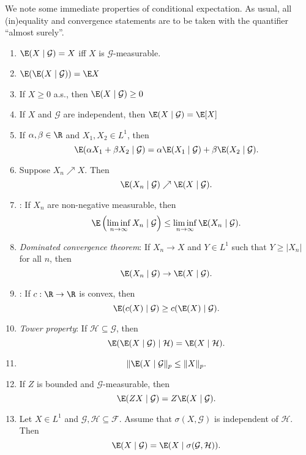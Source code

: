 \documentclass[a4paper]{article}
\begin{document}
We note some immediate properties of conditional expectation. As usual, all (in)equality and convergence statements are to be taken with the quantifier ``almost surely''.
\begin{prop}\leavevmode
  \begin{enumerate}
    \item $\E(X \mid \mathcal{G}) = X$ iff $X$ is $\mathcal{G}$-measurable.
    \item $\E(\E(X \mid \mathcal{G})) = \E X$
    \item If $X \geq 0$ a.s., then $\E(X \mid \mathcal{G}) \geq 0$
    \item If $X$ and $\mathcal{G}$ are independent, then $\E(X \mid \mathcal{G}) = \E[X]$
    \item If $\alpha, \beta \in \R$ and $X_1, X_2 \in L^1$, then
      \[
        \E(\alpha X_1 + \beta X_2 \mid \mathcal{G}) = \alpha \E(X_1 \mid\mathcal{G}) + \beta \E(X_2 \mid \mathcal{G}).
      \]
    \item Suppose $X_n \nearrow X$. Then
      \[
        \E(X_n\mid \mathcal{G}) \nearrow \E(X \mid \mathcal{G}).
      \]
    \item {}: If $X_n$ are non-negative measurable, then
      \[
        \E\left(\liminf_{n \to \infty} X_n \mid \mathcal{G}\right) \leq \liminf_{n \to \infty} \E(X_n \mid \mathcal{G}).
      \]
    \item \emph{Dominated convergence theorem}: If $X_n \to X$ and $Y \in L^1$ such that $Y \geq |X_n|$ for all $n$, then
      \[
        \E(X_n \mid \mathcal{G}) \to \E(X \mid \mathcal{G}).
      \]
    \item {}: If $c: \R \to \R$ is convex, then
      \[
        \E(c(X) \mid \mathcal{G}) \geq c(\E(X) \mid \mathcal{G}).
      \]
    \item \emph{Tower property}: If $\mathcal{H} \subseteq \mathcal{G}$, then
      \[
        \E(\E(X \mid \mathcal{G}) \mid \mathcal{H}) = \E(X \mid \mathcal{H}).
      \]
    \item
      \[
        \|\E(X \mid \mathcal{G}\|_p \leq \|X\|_p.
      \]
    \item If $Z$ is bounded and $\mathcal{G}$-measurable, then
      \[
        \E(ZX \mid \mathcal{G}) = Z \E(X \mid \mathcal{G}).
      \]
    \item Let $X \in L^1$ and $\mathcal{G}, \mathcal{H} \subseteq \mathcal{F}$. Assume that $\sigma(X, \mathcal{G})$ is independent of $\mathcal{H}$. Then
      \[
        \E (X \mid \mathcal{G}) = \E(X \mid \sigma(\mathcal{G}, \mathcal{H})).
      \]
  \end{enumerate}
\end{prop}
\end{document}
